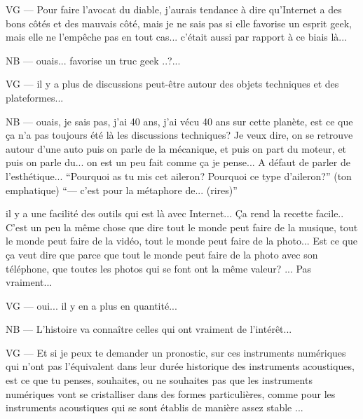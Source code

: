 VG — Pour faire l'avocat du diable, j'aurais tendance à dire qu'Internet a des bons côtés et des mauvais côté, mais je ne sais pas si elle favorise un esprit geek, mais elle ne l'empêche pas en tout cas... c'était aussi par rapport à ce biais là...

NB — ouais... favorise un truc geek ..?...

VG — il y a plus de discussions peut-être autour des objets techniques et des plateformes...

NB — ouais, je sais pas, j'ai 40 ans, j'ai vécu 40 ans sur cette planète, est ce que ça n'a pas toujours été là les discussions techniques? Je veux dire, on se retrouve autour d'une auto puis on parle de la mécanique, et puis on part du moteur, et puis on parle du...  on est un peu fait comme ça je pense... A défaut de parler de l'esthétique... ``Pourquoi as tu mis cet aileron? Pourquoi ce type d'aileron?'' (ton emphatique) ``— c'est pour la métaphore de... (rires)''

il y a une facilité des outils qui est là avec Internet... Ça rend la recette facile.. C'est un peu la même chose que dire tout le monde peut faire de la musique, tout le monde peut faire de la vidéo, tout le monde peut faire de la photo...  Est ce que ça veut dire que parce que tout le monde peut faire de la photo avec son téléphone, que toutes les photos qui se font ont la même valeur? ... Pas vraiment...

VG — oui... il y en a plus en quantité...

NB — L'histoire va connaître celles qui ont vraiment de l'intérêt...

VG — Et si je peux te demander un pronostic, sur ces instruments numériques qui n'ont pas l'équivalent dans leur durée historique des instruments acoustiques, est ce que tu penses, souhaites, ou ne souhaites pas que les instruments numériques vont se cristalliser dans des formes particulières, comme pour les instruments acoustiques qui se sont établis de manière assez stable ...

